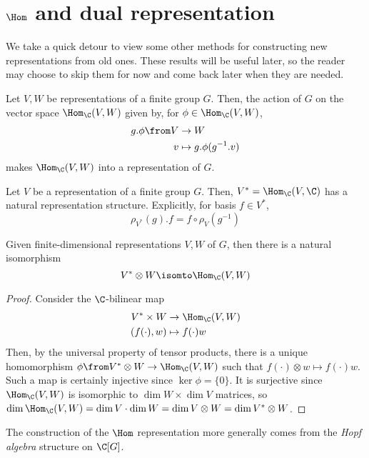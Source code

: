\documentclass[11pt,leqno,oneside]{amsbook}
\numberwithin{thm}{section}
\begin{document}
\section{\(\Hom\) and dual representation}
We take a quick detour to view some other methods for constructing new
representations from old ones. These results will be useful later, so
the reader may choose to skip them for now and come back later when
they are needed.
\begin{prop}\label{def-hom-rep}
  Let \(V,W\) be representations of a finite group \(G\). Then, the
  action of \(G\) on 
  the vector space \(\Hom_\C(V,W)\) given by, for \(\phi \in \Hom_\C(V,W)\),
  \begin{align*}
    g.\phi \from V & \to W \\
    v & \mapsto g.\phi(g^{-1}.v)
  \end{align*}
  makes \(\Hom_\C(V,W)\) into a representation of \(G\). 
\end{prop}
\begin{cor}\label{def-dual-rep}
  Let \(V\) be a representation of a finite group \(G\). Then, \(V^* =
  \Hom_\C(V,\C)\) has a natural representation
  structure. Explicitly, for basis \(f \in V^*\), \[
    \rho_{V^*}(g).f = f \circ \rho_V(g^{-1}) 
  \]
\end{cor}
\begin{prop}\label{tensor-hom-relation}
  Given finite-dimensional representations \(V,W\) of \(G\), then
  there is a natural 
  isomorphism \[
    V^* \otimes W \isomto \Hom_\C(V,W)
  \]
\end{prop}
\begin{proof}
  Consider the \(\C\)-bilinear map
  \begin{align*}
    V^* \times W & \to \Hom_\C(V,W) \\
    (f(\cdot),w) & \mapsto f(\cdot) w
  \end{align*}
  Then, by the universal property of tensor products, there is a
  unique homomorphism \(\phi \from V^* \otimes W \to \Hom_\C(V,W)\)
  such that \(f(\cdot) \otimes w \mapsto f(\cdot) w\). Such a map is
  certainly injective since \(\ker \phi = \{0\}\). It is surjective
  since \(\Hom_\C(V,W)\) is isomorphic to \(\dim W \times \dim V\)
  matrices, so \(\dim \Hom_\C(V,W) = \dim V \cdot \dim W = \dim V
  \otimes W = \dim V^* \otimes W\). 
\end{proof}
\begin{rmk}
  The construction of the \(\Hom\) representation more generally comes
  from the \emph{Hopf algebra} structure on \(\C[G]\). 
\end{rmk}
\end{document}

